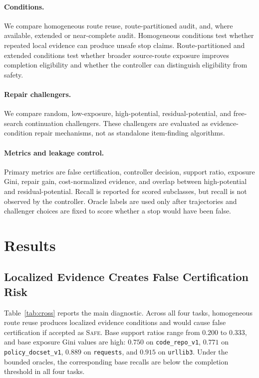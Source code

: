 \documentclass[letterpaper,10pt,twocolumn]{article}
\newcommand{\safe}{\textsc{Safe}}
\begin{document}
\paragraph{Conditions.}
We compare homogeneous route reuse, route-partitioned audit, and, where
available, extended or near-complete audit. Homogeneous conditions test whether
repeated local evidence can produce unsafe stop claims. Route-partitioned and
extended conditions test whether broader source-route exposure improves
completion eligibility and whether the controller can distinguish eligibility
from safety.

\paragraph{Repair challengers.}
We compare random, low-exposure, high-potential, residual-potential, and
free-search continuation challengers. These challengers are evaluated as
evidence-condition repair mechanisms, not as standalone item-finding algorithms.

\paragraph{Metrics and leakage control.}
Primary metrics are false certification, controller decision, support ratio,
exposure Gini, repair gain, cost-normalized evidence, and overlap between
high-potential and residual-potential. Recall is reported for scored subclasses,
but recall is not observed by the controller. Oracle labels are used only after
trajectories and challenger choices are fixed to score whether a stop would have
been false.

\section{Results}

\subsection{Localized Evidence Creates False Certification Risk}

Table~\ref{tab:cross} reports the main diagnostic. Across all four tasks,
homogeneous route reuse produces localized evidence conditions and would cause
false certification if accepted as \safe{}. Base support ratios range from
\(0.200\) to \(0.333\), and base exposure Gini values are high: \(0.750\) on
\texttt{code\_repo\_v1}, \(0.771\) on \texttt{policy\_docset\_v1}, \(0.889\)
on \texttt{requests}, and \(0.915\) on \texttt{urllib3}. Under the bounded
oracles, the corresponding base recalls are below the completion threshold in
all four tasks.
\end{document}
